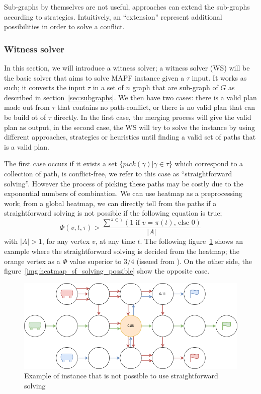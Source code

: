 Sub-graphs by themselves are not useful, approaches can extend the sub-graphs according to strategies. Intuitively, an ``extension'' represent additional possibilities in order to solve a conflict. 

\subsubsection{Witness solver}

In this section, we will introduce a witness solver; a witness solver (WS) will be the basic solver that aims to solve MAPF instance given a \(\tau\) input. It works as such; it converts the input \(\tau\) in a set of \(n\) graph that are sub-graph of \(G\) as described in section~\ref{sec:subgraphs}. We then have two cases: there is a valid plan made out from \(\tau\) that contains no path-conflict, or there is no valid plan that can be build ot of \(\tau\) directly. In the first case, the merging process will give the valid plan as output, in the second case, the WS will try to solve the instance by using different approaches, strategies or heuristics until finding a valid set of paths that is a valid plan.

The first case occurs if it exists a set \(\{pick(\gamma) | \gamma \in \tau\}\) which correspond to a collection of path, is conflict-free, we refer to this case as ``straightforward solving''. However the process of picking these paths may be costly due to the exponential numbers of combination. We can use heatmap as a preprocessing work; from a global heatmap, we can directly tell from the paths if a straightforward solving is not possible if the following equation is true; 
\[ 
  \Phi(v,t,\tau) > \frac{ \sum^{\pi \in \gamma}{(1 \text{ if } v = \pi(t) \text{, else } 0)}}{|A|}
\] 
with \(|A| > 1\), for any vertex \(v\), at any time \(t\). The following figure~\ref{img:heatmap_sf_solving} shows an example where the straightforward solving is decided from the heatmap; the orange vertex as a \(\Phi\) value superior to \(3/4\) (issued from ). On the other side, the figure~\ref{img:heatmap_sf_solving_possible} show the opposite case.

\begin{figure}[H]
  \centering
  \caption{Example of instance that is not possible to use straightforward solving}\label{img:heatmap_sf_solving}
  \includegraphics[width=\widthimg]{img/heatmap_sf_solving.drawio.png}
\end{figure}

